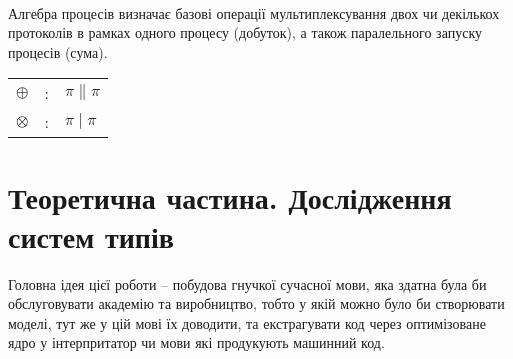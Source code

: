 \begin{prooftree}
\end{prooftree}

\begin{prooftree}
\end{prooftree}

\begin{prooftree}
\end{prooftree}
\paragraph{}

    \paragraph{}
    Алгебра процесів визначає базові операції мультиплексування двох чи декількох
    протоколів в рамках одного процесу (добуток), а також паралельного запуску процесів (сума).

\begin{center}
\begin{tabular}{lcl}
$\oplus$   &:& $\pi \parallel \pi$\\
$\otimes$  &:& $\pi \mid \pi$\\
\end{tabular}
\end{center}

\newpage
\section{Теоретична частина. Дослідження систем типів}
Головна ідея цієї роботи -- побудова гнучкої сучасної мови,
яка здатна була би обслуговувати академію та виробництво,
тобто у якій можно було би створювати моделі, тут же у цій мові їх доводити,
та екстрагувати код через оптимізоване ядро у інтерпритатор чи мови які продукують машинний код.

